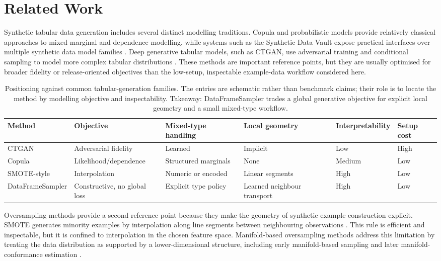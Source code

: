 \section{Related Work}
\label{sec:related-work}

Synthetic tabular data generation includes several distinct modelling
traditions. Copula and probabilistic models provide relatively classical
approaches to mixed marginal and dependence modelling, while systems such as
the Synthetic Data Vault expose practical interfaces over multiple synthetic
data model families \citep{patki2016sdv}. Deep generative tabular models, such
as CTGAN, use adversarial training and conditional sampling to model more
complex tabular distributions \citep{xu2019ctgan}. These methods are important
reference points, but they are usually optimised for broader fidelity or
release-oriented objectives than the low-setup, inspectable example-data
workflow considered here.

\begin{table}[t]
\centering
\caption{Positioning against common tabular-generation families. The entries
are schematic rather than benchmark claims; their role is to locate the method
by modelling objective and inspectability. Takeaway: DataFrameSampler trades a
global generative objective for explicit local geometry and a small
mixed-type workflow.}
\label{tab:method-positioning}
\small
\begin{adjustbox}{max width=\textwidth}
\begin{tabular}{@{}llllll@{}}
\toprule
Method & Objective & Mixed-type handling & Local geometry & Interpretability & Setup cost \\
\midrule
CTGAN & Adversarial fidelity & Learned & Implicit & Low & High \\
Copula & Likelihood/dependence & Structured marginals & None & Medium & Low \\
SMOTE-style & Interpolation & Numeric or encoded & Linear segments & High & Low \\
DataFrameSampler & Constructive, no global loss & Explicit type policy & Learned neighbour transport & High & Low \\
\bottomrule
\end{tabular}
\end{adjustbox}
\end{table}

Oversampling methods provide a second reference point because they make the
geometry of synthetic example construction explicit. SMOTE generates minority
examples by interpolation along line segments between neighbouring observations
\citep{chawla2002smote}. This rule is efficient and inspectable, but it is
confined to interpolation in the chosen feature space. Manifold-based
oversampling methods address this limitation by treating the data distribution
as supported by a lower-dimensional structure, including early manifold-based
sampling and later manifold-conformance estimation
\citep{nguyen2005manifold,bellinger2018manifold}.

